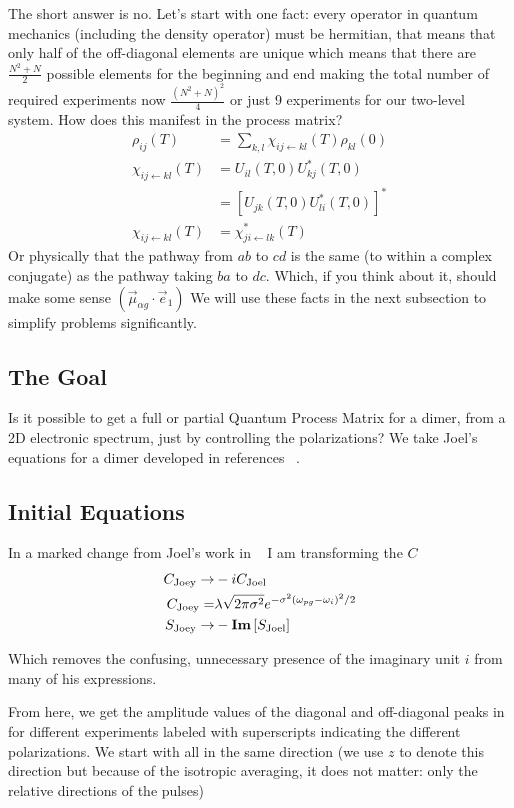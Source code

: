 The short answer is no.  Let's start with one fact: every operator in quantum mechanics (including the density operator) must be hermitian, that means that only half of the off-diagonal elements are unique which means that there are $\frac{N^2 + N}{2}$ possible elements for the beginning and end making the total number of required experiments now $\frac{(N^2 + N)^2}{4}$ or just 9 experiments for our two-level system.  How does this manifest in the process matrix?
\begin{align}
	\rho_{ij}(T) &= \sum_{k,l} \chi_{ij \leftarrow kl}(T)\rho_{kl}(0) \\
	\chi_{ij \leftarrow kl}(T) &= U_{il}(T, 0) U_{kj}^{*}(T,0)\\
	&= \left[ U_{jk}(T,0) U_{li}^{*}(T, 0) \right]^{*} \\
	\chi_{ij \leftarrow kl}(T) &= \chi^{*}_{ji \leftarrow lk}(T)
\end{align}
Or physically that the pathway from $ab$ to $cd$ is the same (to within a complex conjugate) as the pathway taking $ba$ to $dc$.  Which, if you think about it, should make some sense
$\left(\vec{\mu}_{\alpha g} \cdot \vec{e}_1 \right)$
We will use these facts in the next subsection to simplify problems significantly.

\subsection{The Goal}
Is it possible to get a full or partial Quantum Process Matrix for a dimer, from a 2D electronic spectrum, just by controlling the polarizations?  We take Joel's equations for a dimer developed in references ~\cite{QPT1,QPT2}.
\subsection{Initial Equations}
In a marked change from Joel's work in ~\cite{QPT1,QPT2} I am transforming the $C$
\begin{align*}
	C_{\text{Joey}} \rightarrow& - i C_{\text{Joel}} \\
	C_{\text{Joey}} =& \lambda \sqrt{2 \pi \sigma^2} e^{-\sigma^2 \left( \omega_{pg} - \omega_i \right)^2 / 2} \\
	S_{\text{Joey}} \rightarrow& -\textbf{Im} \left[ S_{\text{Joel}} \right]
\end{align*}

Which removes the confusing, unnecessary presence of the imaginary unit $i$ from many of his expressions.

From here, we get the amplitude values of the diagonal and off-diagonal peaks in for different experiments labeled with superscripts indicating the different polarizations.  We start with all in the same direction (we use $z$ to denote this direction but because of the isotropic averaging, it does not matter: only the relative directions of the pulses)

